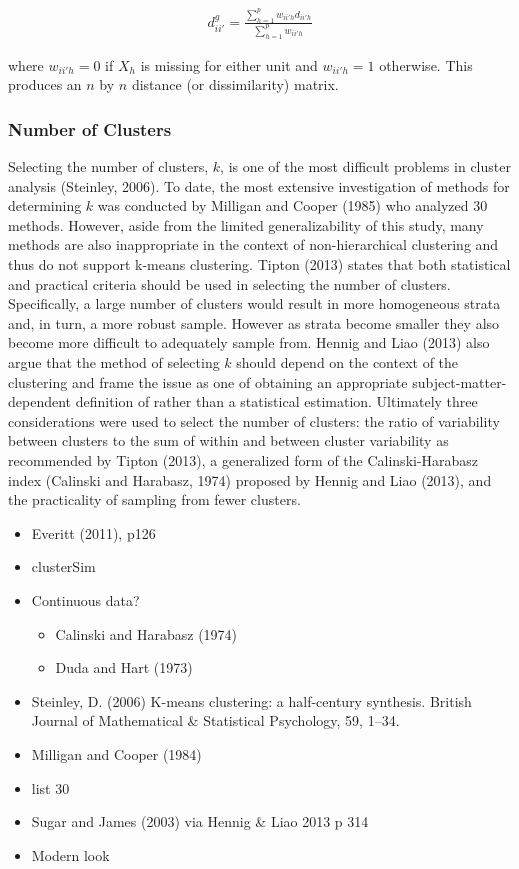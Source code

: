 \documentclass[man]{apa6}
\providecommand{\tightlist}{%
  \setlength{\itemsep}{0pt}\setlength{\parskip}{0pt}}
\theoremstyle{definition}
\theoremstyle{definition}
\theoremstyle{definition}
\theoremstyle{remark}
\begin{document}
\begin{align}
  d^{g}_{ii'} = \frac{\sum^p_{h = 1}w_{ii'h}d_{ii'h}}{\sum^p_{h = 1}w_{ii'h}}
\end{align}

where \(w_{ii'h} = 0\) if \(X_h\) is missing for either unit and
\(w_{ii'h} = 1\) otherwise. This produces an \(n\) by \(n\) distance (or
dissimilarity) matrix.

\subsubsection{Number of Clusters}\label{number-of-clusters}

Selecting the number of clusters, \(k\), is one of the most difficult
problems in cluster analysis (Steinley, 2006). To date, the most
extensive investigation of methods for determining \(k\) was conducted
by Milligan and Cooper (1985) who analyzed 30 methods. However, aside
from the limited generalizability of this study, many methods are also
inappropriate in the context of non-hierarchical clustering and thus do
not support k-means clustering. Tipton (2013) states that both
statistical and practical criteria should be used in selecting the
number of clusters. Specifically, a large number of clusters would
result in more homogeneous strata and, in turn, a more robust sample.
However as strata become smaller they also become more difficult to
adequately sample from. Hennig and Liao (2013) also argue that the
method of selecting \(k\) should depend on the context of the clustering
and frame the issue as one of obtaining an appropriate
subject-matter-dependent definition of rather than a statistical
estimation. Ultimately three considerations were used to select the
number of clusters: the ratio of variability between clusters to the sum
of within and between cluster variability as recommended by Tipton
(2013), a generalized form of the Calinski-Harabasz index (Calinski and
Harabasz, 1974) proposed by Hennig and Liao (2013), and the practicality
of sampling from fewer clusters.

\begin{itemize}
\item
  Everitt (2011), p126
\item
  clusterSim
\item
  Continuous data?

  \begin{itemize}
  \tightlist
  \item
    Calinski and Harabasz (1974)
  \item
    Duda and Hart (1973)
  \end{itemize}
\item
  Steinley, D. (2006) K-means clustering: a half-century synthesis.
  British Journal of Mathematical \& Statistical Psychology, 59, 1--34.
\item
  Milligan and Cooper (1984)
\item
  list 30
\item
  Sugar and James (2003) via Hennig \& Liao 2013 p 314
\item
  Modern look
\end{itemize}
\end{document}
